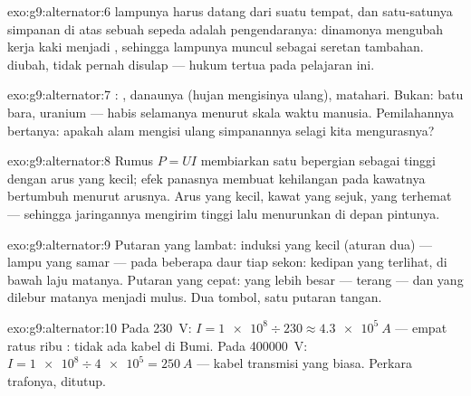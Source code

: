 \begin{solution}{exo:g9:alternator:6}
 lampunya harus datang dari suatu tempat, dan satu-satunya
simpanan di atas sebuah sepeda adalah pengendaranya: dinamonya
mengubah kerja kaki menjadi , sehingga  lampunya muncul
sebagai seretan tambahan.  diubah, tidak pernah disulap ---
hukum tertua pada pelajaran ini.
\end{solution}

\begin{solution}{exo:g9:alternator:7}
: , danaunya (hujan mengisinya ulang),  matahari.
Bukan: batu bara, uranium --- habis selamanya menurut skala waktu
manusia. Pemilahannya bertanya: apakah alam mengisi ulang simpanannya
selagi kita mengurasnya?
\end{solution}

\begin{solution}{exo:g9:alternator:8}
Rumus $P = U I$ membiarkan satu  bepergian sebagai  tinggi
dengan arus yang kecil; efek panasnya membuat kehilangan pada kawatnya
bertumbuh menurut arusnya. Arus yang kecil, kawat yang sejuk, 
yang terhemat --- sehingga jaringannya mengirim tinggi lalu menurunkan
 di depan pintunya.
\end{solution}

\begin{solution}{exo:g9:alternator:9}
Putaran yang lambat:  induksi yang kecil (aturan dua) ---
lampu yang samar --- pada beberapa daur tiap sekon: kedipan yang
terlihat, di bawah laju  matanya. Putaran yang cepat:
 yang lebih besar --- terang --- dan  yang dilebur
matanya menjadi mulus. Dua tombol, satu putaran tangan.
\end{solution}

\begin{solution}{exo:g9:alternator:10}
Pada \qty{230}{V}: $I = \num{1e8} \div 230 \approx
\qty{4.3e5}{A}$ --- empat ratus ribu : tidak ada kabel di Bumi.
Pada \qty{400000}{V}: $I = \num{1e8} \div
\num{4e5} = \qty{250}{A}$ --- kabel transmisi yang biasa. Perkara
trafonya, ditutup.
\end{solution}

